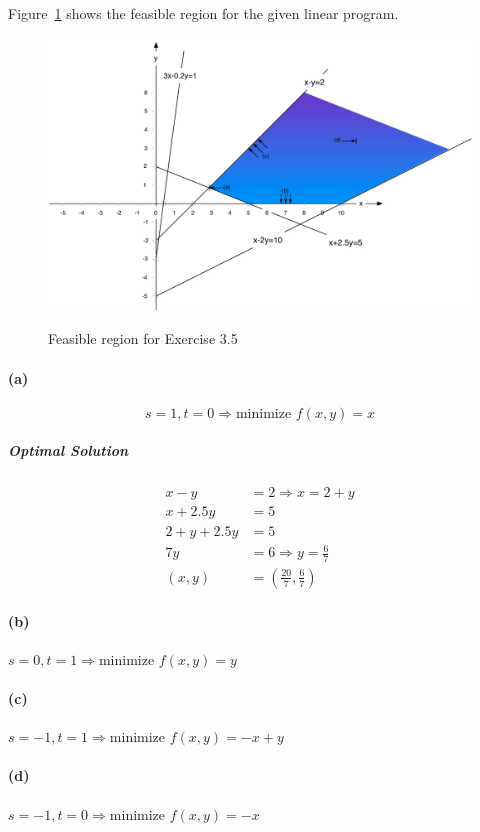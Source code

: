 \documentclass[a4paper, 12pt]{report}
\begin{document}
Figure~\ref{figure:Exercise_3_5_Feasible_Region} shows the feasible region for
the given linear program.

\begin{figure}[htbp]
    \caption{Feasible region for Exercise 3.5}
    \vskip 0.2cm
    \centering
    \includegraphics[width=\textwidth]{Figures/Exercise_3_5_Feasible_Region}
    \label{figure:Exercise_3_5_Feasible_Region}
\end{figure}

\paragraph{(a)}
\[
    s=1, t=0 ⇒ \text{minimize } f(x,y) = x
\]

\subparagraph{Optimal Solution}
\begin{align*}
    x-y      &= 2 ⇒ x=2+y\\
    x+2.5y   &= 5\\
    2+y+2.5y &= 5\\
    7y       &= 6 ⇒ y = \frac{6}{7}\\
    (x,y)    &= (\frac{20}{7}, \frac{6}{7})
\end{align*}

\paragraph{(b)} $s=0, t=1 ⇒ \text{minimize } f(x,y) = y$

\paragraph{(c)} $s=-1, t=1 ⇒ \text{minimize } f(x,y) = -x+y$

\paragraph{(d)} $s=-1, t=0 ⇒ \text{minimize } f(x,y) = -x$
\end{document}
